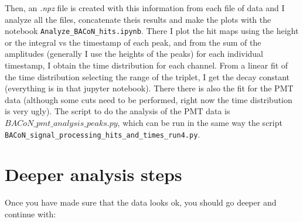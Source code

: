 \documentclass[11pt,a4paper,english,oneside, pdf]{article}
\begin{document}
	Then, an \textit{.npz} file is created with this information from each file of data and I analyze all the files, concatenate theis results and make the plots with the notebook \verb|Analyze_BACoN_hits.ipynb|. There I plot the hit maps using the height or the integral vs the timestamp of each peak, and from the sum of the amplitudes (generally I use the heights of the peaks) for each individual timestamp, I obtain the time distribution for each channel. From a linear fit of the time distribution selecting the range of the triplet, I get the decay constant (everything is in that jupyter notebook). There there is also the fit for the PMT data (although some cuts need to be performed, right now the time distribution is very ugly). The script to do the analysis of the PMT data is \href{https://github.com/carmenromo/BACON/blob/main/BACoN_pmt_analysis_peaks.py}{$BACoN\_pmt\_analysis\_peaks.py$}, which can be run in the same way the script \verb|BACoN_signal_processing_hits_and_times_run4.py|.
	
	\section{Deeper analysis steps}
	
	Once you have made sure that the data looks ok, you should go deeper and continue with:
	
\end{document}
